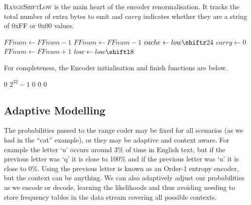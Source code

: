\documentclass[a4paper]{article}
\begin{document}
\textsc{RangeShiftLow} is the main heart of the encoder renormalisation.
It tracks the total number of extra bytes to emit and $carry$ indicates whether they are a string of 0xFF or 0x00 values.

\begin{algorithmic}[1]
      \State {} 
        \State {}
        \State $FFnum \gets FFnum - 1$
      \EndWhile
    \Else
      \State {} 
        \State {}
        \State $FFnum \gets FFnum - 1$
      \EndWhile
    \EndIf
    \State $cache \gets low \shiftr 24$ 
    \State $carry \gets 0$
  \Else
    \State $FFnum \gets FFnum + 1$
  \EndIf
  \Statex
  \State $low \gets low \shiftl 8$
\EndProcedure
\end{algorithmic}

For completeness, the Encoder initialisation and finish functions are below.

\begin{algorithmic}[1]
  \settowidth{\maxwidth}{FFnum\ }
  \State {} $0$
  \State {} $2^{32}-1$
  \State {} $0$
  \State {} $0$
  \State {} $0$
\EndProcedure
\end{algorithmic}

\begin{algorithmic}[1]
   
    \State {}
  \EndFor
\EndProcedure
\end{algorithmic}


\subsection{Adaptive Modelling}

The probabilities passed to the range coder may be fixed for all scenarios (as we had in the ``cat'' example), or they may be adaptive and context aware.
For example the letter `u' occurs around 3\% of time in English text, but if the previous letter was `q' it is close to 100\% and if the previous letter was `u' it is close to 0\%.
Using the previous letter is known as an Order-1 entropy encoder, but the context can be anything.
We can also adaptively adjust our probabilities as we encode or
decode, learning the likelihoods and thus avoiding needing to store
frequency tables in the data stream covering all possible contexts.
\end{document}
